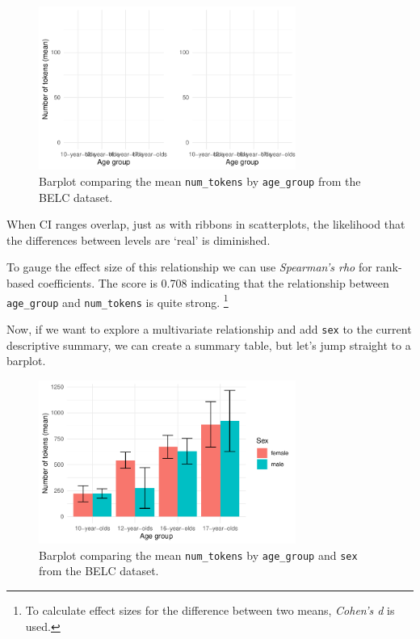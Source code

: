 \documentclass[
  letterpaper,
]{latex/krantz}
\begin{document}
\begin{figure}[h]

{\centering \includegraphics[width=0.75\textwidth,height=\textheight]{approaching-analysis_files/figure-pdf/fig-summaries-bivariate-barplot-belc-1.pdf}

}

\caption{\label{fig-summaries-bivariate-barplot-belc}Barplot comparing
the mean \texttt{num\_tokens} by \texttt{age\_group} from the BELC
dataset.}

\end{figure}

When CI ranges overlap, just as with ribbons in scatterplots, the
likelihood that the differences between levels are `real' is diminished.

To gauge the effect size of this relationship we can use
\emph{Spearman's rho} for rank-based coefficients. The score is 0.708
indicating that the relationship between \texttt{age\_group} and
\texttt{num\_tokens} is quite strong. \footnote{To calculate effect
  sizes for the difference between two means, \emph{Cohen's d} is used.}

Now, if we want to explore a multivariate relationship and add
\texttt{sex} to the current descriptive summary, we can create a summary
table, but let's jump straight to a barplot.

\begin{figure}[h]

{\centering \includegraphics[width=0.75\textwidth,height=\textheight]{approaching-analysis_files/figure-pdf/fig-summaries-multivariate-barplot-belc-1.pdf}

}

\caption{\label{fig-summaries-multivariate-barplot-belc}Barplot
comparing the mean \texttt{num\_tokens} by \texttt{age\_group} and
\texttt{sex} from the BELC dataset.}

\end{figure}
\end{document}
